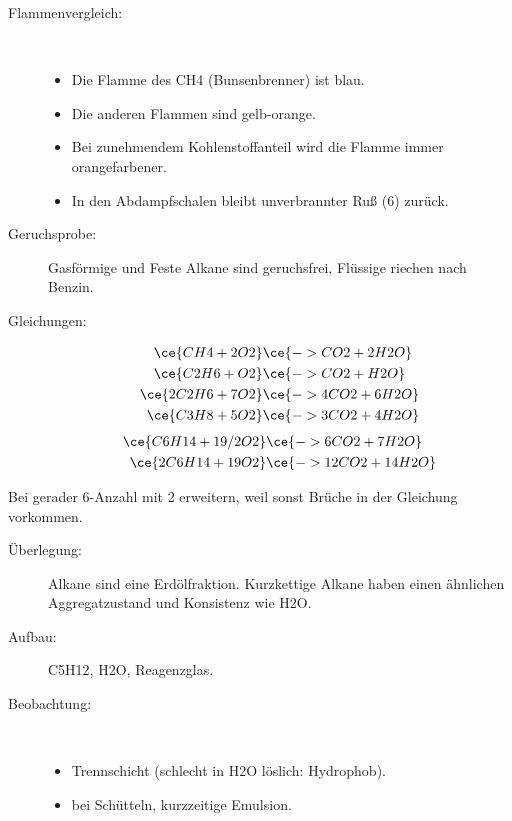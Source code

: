 \begin{description}
	\item[Flammenvergleich:]~
	\begin{itemize}
		\item Die Flamme des \ac{CH4} (Bunsenbrenner) ist blau.
		\item Die anderen Flammen sind gelb-orange.
		\item Bei zunehmendem Kohlenstoffanteil wird die Flamme immer orangefarbener.
		\item In den Abdampfschalen bleibt unverbrannter Ruß (\ac{6}) zurück.
	\end{itemize}
	\item[Geruchsprobe:] Gasförmige und Feste Alkane sind geruchsfrei, Flüssige riechen
		nach Benzin.
	\item[Gleichungen:]
	\begin{align}
		\ce{CH4 + 2O2}			& \ce{-> CO2 + 2H2O} \\
		\ce{C2H6 + O2}			& \ce{-> CO2 + H2O} \\
		\ce{2C2H6 + 7O2}		& \ce{-> 4CO2 + 6H2O} \\
		\ce{C3H8 + 5O2}			& \ce{-> 3CO2 + 4H2O}
	\end{align}
	\begin{align}
		\ce{C6H14 + 19/2O2}		& \ce{-> 6CO2 + 7H2O} \\
		\ce{2C6H14 + 19O2}		& \ce{-> 12CO2 + 14H2O}
	\end{align}
\end{description}

\vspace{-0.5cm}
Bei gerader \ac{6}-Anzahl mit 2 erweitern, weil sonst Brüche in der Gleichung vorkommen.

\begin{description}
	\item[Überlegung:] Alkane sind eine Erdölfraktion. Kurzkettige Alkane haben einen
		ähnlichen Aggregatzustand und Konsistenz wie \ac{H2O}.
	\item[Aufbau:] \ac{C5H12}, \ac{H2O}, Reagenzglas.
	\item[Beobachtung:]~
	\begin{itemize}
		\item Trennschicht (schlecht in \ac{H2O} löslich: Hydrophob).
		\item bei Schütteln, kurzzeitige Emulsion.
	\end{itemize}
\end{description}

